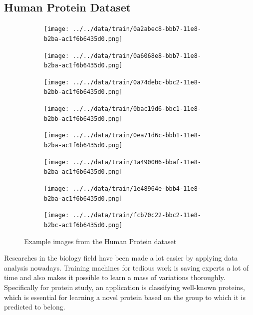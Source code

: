 \documentclass{article}
\begin{document}
\subsection{Human Protein Dataset}
\begin{figure}[h!]
    \centering
    \begin{subfigure}[b]{0.2\linewidth}
      \texttt{[image: ../../data/train/0a2abec8-bbb7-11e8-b2ba-ac1f6b6435d0.png]}
    \end{subfigure}
    \begin{subfigure}[b]{0.2\linewidth}
      \texttt{[image: ../../data/train/0a6068e8-bbb7-11e8-b2ba-ac1f6b6435d0.png]}
    \end{subfigure}
    \begin{subfigure}[b]{0.2\linewidth}
        \texttt{[image: ../../data/train/0a74debc-bbc2-11e8-b2bb-ac1f6b6435d0.png]}
    \end{subfigure}
    \begin{subfigure}[b]{0.2\linewidth}
        \texttt{[image: ../../data/train/0bac19d6-bbc1-11e8-b2bb-ac1f6b6435d0.png]}
    \end{subfigure}

    \begin{subfigure}[b]{0.2\linewidth}
        \texttt{[image: ../../data/train/0ea71d6c-bbb1-11e8-b2ba-ac1f6b6435d0.png]}
      \end{subfigure}
      \begin{subfigure}[b]{0.2\linewidth}
        \texttt{[image: ../../data/train/1a490006-bbaf-11e8-b2ba-ac1f6b6435d0.png]}
      \end{subfigure}
      \begin{subfigure}[b]{0.2\linewidth}
          \texttt{[image: ../../data/train/1e48964e-bbb4-11e8-b2ba-ac1f6b6435d0.png]}
      \end{subfigure}
      \begin{subfigure}[b]{0.2\linewidth}
          \texttt{[image: ../../data/train/fcb70c22-bbc2-11e8-b2bc-ac1f6b6435d0.png]}
      \end{subfigure}
    \caption{Example images from the Human Protein dataset}
  \end{figure}
  
Researches in the biology field have been made a lot easier by applying data analysis nowadays. Training machines for tedious work is saving experts a lot of time and also makes it possible to learn a mass of variations thoroughly. Specifically for protein study, an application is classifying well-known proteins, which is essential for learning a novel protein based on the group to which it is predicted to belong\cite{subcellular}. 
\end{document}
